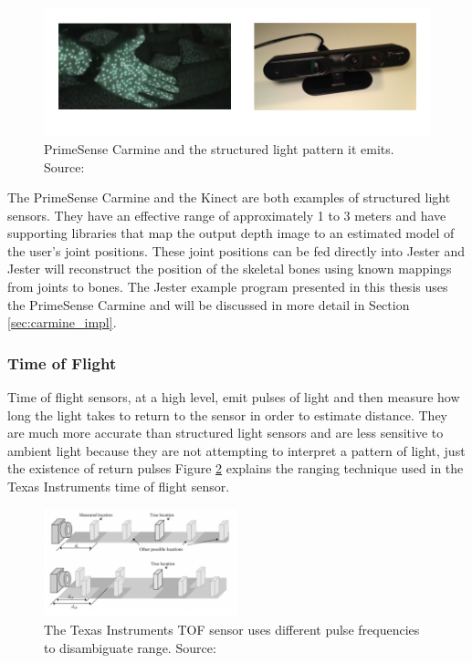 \begin{figure}[]
\centering
\includegraphics[width=1\textwidth]{figures/carminePattern}
\caption{PrimeSense Carmine and the structured light pattern it emits. Source: \cite{structured_pattern}}
\label{fig:carmine_light}
\end{figure}

The PrimeSense Carmine and the Kinect are both examples of structured light sensors. They have an effective range of approximately 1 to 3 meters and have supporting libraries that map the output depth image to an estimated model of the user's joint positions. These joint positions can be fed directly into Jester and Jester will reconstruct the position of the skeletal bones using known mappings from joints to bones. The Jester example program presented in this thesis uses the PrimeSense Carmine and will be discussed in more detail in Section \ref{sec:carmine_impl}.

\subsubsection{Time of Flight}

Time of flight sensors, at a high level, emit pulses of light and then measure how long the light takes to return to the sensor in order to estimate distance. They are much more accurate than structured light sensors and are less sensitive to ambient light because they are not attempting to interpret a pattern of light, just the existence of return pulses \cite{litime} Figure \ref{fig:tof} explains the ranging technique used in the Texas Instruments time of flight sensor. 

\begin{figure}[]
\centering
\includegraphics[width=0.5\textwidth]{figures/tilight}
\caption{The Texas Instruments TOF sensor uses different pulse frequencies to disambiguate range. Source: \cite{litime}}
\label{fig:tof}
\end{figure}

